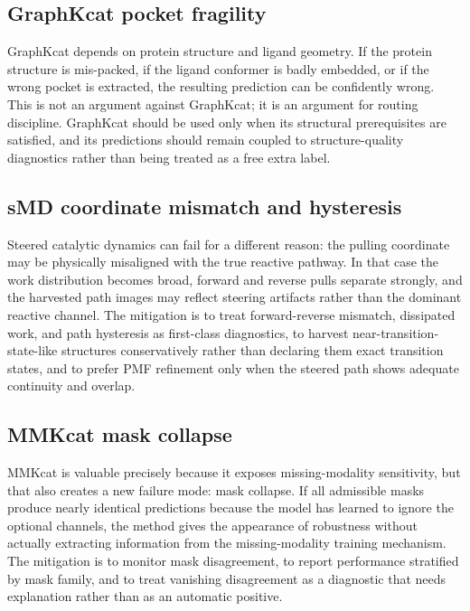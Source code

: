 \documentclass[11pt]{article}
\begin{document}
	\subsection{GraphKcat pocket fragility}
	
	GraphKcat depends on protein structure and ligand geometry. If the protein structure is mis-packed, if the ligand conformer is badly embedded, or if the wrong pocket is extracted, the resulting prediction can be confidently wrong. This is not an argument against GraphKcat; it is an argument for routing discipline. GraphKcat should be used only when its structural prerequisites are satisfied, and its predictions should remain coupled to structure-quality diagnostics rather than being treated as a free extra label.
	
	\subsection{sMD coordinate mismatch and hysteresis}
	
	Steered catalytic dynamics can fail for a different reason: the pulling coordinate may be physically misaligned with the true reactive pathway. In that case the work distribution becomes broad, forward and reverse pulls separate strongly, and the harvested path images may reflect steering artifacts rather than the dominant reactive channel. The mitigation is to treat forward-reverse mismatch, dissipated work, and path hysteresis as first-class diagnostics, to harvest near-transition-state-like structures conservatively rather than declaring them exact transition states, and to prefer PMF refinement only when the steered path shows adequate continuity and overlap.
	
	\subsection{MMKcat mask collapse}
	
	MMKcat is valuable precisely because it exposes missing-modality sensitivity, but that also creates a new failure mode: mask collapse. If all admissible masks produce nearly identical predictions because the model has learned to ignore the optional channels, the method gives the appearance of robustness without actually extracting information from the missing-modality training mechanism. The mitigation is to monitor mask disagreement, to report performance stratified by mask family, and to treat vanishing disagreement as a diagnostic that needs explanation rather than as an automatic positive.
	
\end{document}
